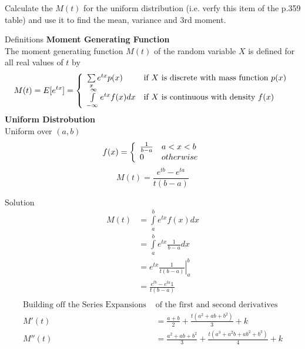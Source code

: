 \documentclass{article}
\begin{document}
\begin{spacing}{1.1}
\maketitle
\newpage
\begin{homeworkProblem}
  Calculate the $M(t)$ for the uniform distribution (i.e. verfy this 
  item of the p.359 table) and use it to find the mean, variance 
  and 3rd moment.
  \begin{homeworkSection}{Definitions}
    {\bf Moment Generating Function}\\
      The moment generating function $M(t)$ of the random variable $X$ 
      is defined for all real values of $t$ by
      \[
        M(t) = E[ e^{tx}] = \left\{ \begin{array}{l l}
          \sum\limits_x e^{tx} p(x) &\text{if $X$ is discrete with mass function $p( x)$}\\
          \int\limits_{-\infty}^\infty e^{tx} f( x) dx 
              &\text{if $X$ is continuous with density $f( x)$}
        \end{array}\right.
      \]
    {\bf Uniform Distrobution}\\
    Uniform over $(a,b)$
      \[
        f( x) = \left\{ \begin{array}{l l}
          \frac{ 1}{ b - a} & a < x < b\\
          0 & otherwise
        \end{array} \right.
      \]
    \[M(t) = \frac{ e^{tb} - e^{ta}}{ t(b - a)}\]
  \end{homeworkSection}
  \begin{homeworkSection}{Solution}
    \begin{align*}
      M( t) &= \int\limits_a^b e^{t x} f(x) dx\\
      &= \int\limits_a^b e^{t x} \frac{ 1}{ b - a} dx\\
      &= \left. e^{t x} \frac{ 1}{ t(b - a)} \right|_a^b\\
      &= \frac{ e^{t b} - e^{t a}1}{ t(b - a)}\\
    \end{align*}
    \begin{align*}
      \text{Building off the Series Expansions } &\text{of the first and second derivatives}\\
      M'(t) &= \frac{ a + b}{ 2} + \frac{ t (a^2 + ab + b^2)}{ 3} + k\\
      M''(t) &= \frac{ a^2 + ab + b^2}{ 3} + \frac{ t (a^3 + a^2 b + a b^2 + b^3)}{ 4} + k\\

\end{align*}
\end{homeworkSection}
\end{homeworkProblem}
\end{spacing}
\end{document}
